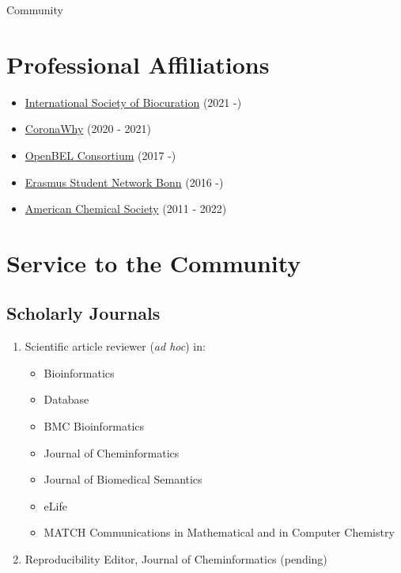 \documentclass[10pt,a4paper,sans]{moderncv} %
\begin{document}
\hfill \break
{\huge Community}

    \section{Professional Affiliations}
    \begin{itemize}
        \item     \href{https://bioregistry.io/wikidata:Q23809291}{International Society of Biocuration} (2021 -)

        \item     \href{https://bioregistry.io/wikidata:Q95587147}{CoronaWhy} (2020 - 2021)

        \item     \href{https://bioregistry.io/wikidata:}{OpenBEL Consortium} (2017 -)

        \item     \href{https://bioregistry.io/wikidata:Q655757}{Erasmus Student Network Bonn} (2016 -)

        \item     \href{https://bioregistry.io/wikidata:Q247556}{American Chemical Society} (2011 - 2022)

    \end{itemize}

\section{Service to the Community}

\subsection{Scholarly Journals}

\begin{enumerate}
\item Scientific article reviewer (\textit{ad hoc}) in:
\begin{itemize}
    \item Bioinformatics
    \item Database
    \item BMC Bioinformatics
    \item Journal of Cheminformatics
    \item Journal of Biomedical Semantics
    \item eLife
    \item MATCH Communications in Mathematical and in Computer Chemistry
\end{itemize}
\item Reproducibility Editor, Journal of Cheminformatics (pending)
\end{enumerate}
\end{document}
